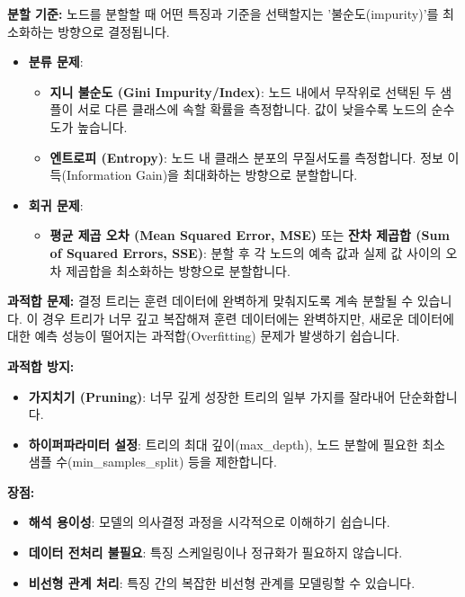 \documentclass[11pt,a4paper]{article}
\theoremstyle{definition}
\begin{document}
\textbf{분할 기준:}
노드를 분할할 때 어떤 특징과 기준을 선택할지는 '불순도(impurity)'를 최소화하는 방향으로 결정됩니다.
\begin{itemize}
    \item \textbf{분류 문제}:
        \begin{itemize}
            \item \textbf{지니 불순도 (Gini Impurity/Index)}: 노드 내에서 무작위로 선택된 두 샘플이 서로 다른 클래스에 속할 확률을 측정합니다. 값이 낮을수록 노드의 순수도가 높습니다.
            \item \textbf{엔트로피 (Entropy)}: 노드 내 클래스 분포의 무질서도를 측정합니다. 정보 이득(Information Gain)을 최대화하는 방향으로 분할합니다.
        \end{itemize}
    \item \textbf{회귀 문제}:
        \begin{itemize}
            \item \textbf{평균 제곱 오차 (Mean Squared Error, MSE)} 또는 \textbf{잔차 제곱합 (Sum of Squared Errors, SSE)}: 분할 후 각 노드의 예측 값과 실제 값 사이의 오차 제곱합을 최소화하는 방향으로 분할합니다.
        \end{itemize}
\end{itemize}

\textbf{과적합 문제:}
결정 트리는 훈련 데이터에 완벽하게 맞춰지도록 계속 분할될 수 있습니다. 이 경우 트리가 너무 깊고 복잡해져 훈련 데이터에는 완벽하지만, 새로운 데이터에 대한 예측 성능이 떨어지는 과적합(Overfitting) 문제가 발생하기 쉽습니다.

\textbf{과적합 방지:}
\begin{itemize}
    \item \textbf{가지치기 (Pruning)}: 너무 깊게 성장한 트리의 일부 가지를 잘라내어 단순화합니다.
    \item \textbf{하이퍼파라미터 설정}: 트리의 최대 깊이(max\_depth), 노드 분할에 필요한 최소 샘플 수(min\_samples\_split) 등을 제한합니다.
\end{itemize}

\textbf{장점:}
\begin{itemize}
    \item \textbf{해석 용이성}: 모델의 의사결정 과정을 시각적으로 이해하기 쉽습니다.
    \item \textbf{데이터 전처리 불필요}: 특징 스케일링이나 정규화가 필요하지 않습니다.
    \item \textbf{비선형 관계 처리}: 특징 간의 복잡한 비선형 관계를 모델링할 수 있습니다.
\end{itemize}
\end{document}
